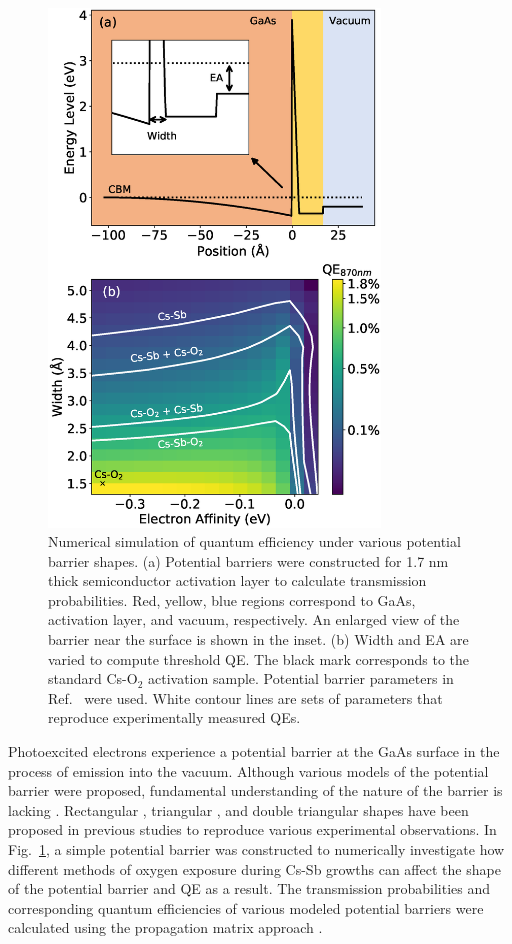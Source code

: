 \begin{figure}
	\centering
	\includegraphics*[width=250pt]{figs/CsSbO/pb.eps}
	\caption{Numerical simulation of quantum efficiency under various potential barrier shapes. (a) Potential barriers were constructed for 1.7 nm thick semiconductor activation layer to calculate transmission probabilities. Red, yellow, blue regions correspond to GaAs, activation layer, and vacuum, respectively. An enlarged view of the barrier near the surface is shown in the inset. (b) Width and EA are varied to compute threshold QE. The black mark corresponds to the standard Cs-O$_2$ activation sample. Potential barrier parameters in Ref.~\cite{vergara1999} were used. White contour lines are sets of parameters that reproduce experimentally measured QEs.}
	\label{fig_potentialBarrier}
	
\end{figure}

Photoexcited electrons experience a potential barrier at the GaAs surface in the process of emission into the vacuum. Although various models of the potential barrier were proposed, fundamental understanding of the nature of the barrier is lacking \cite{karkare2013, jin2014}. Rectangular \cite{fisher1972}, triangular \cite{vergara1999}, and double triangular \cite{jin2014} shapes have been proposed in previous studies to reproduce various experimental observations. In Fig.~\ref{fig_potentialBarrier}, a simple potential barrier was constructed to numerically investigate how different methods of oxygen exposure during Cs-Sb growths can affect the shape of the potential barrier and QE as a result. The transmission probabilities and corresponding quantum efficiencies of various modeled potential barriers were calculated using the propagation matrix approach \cite{karkare2013,levi2006applied,gilmore2004elementary}.

